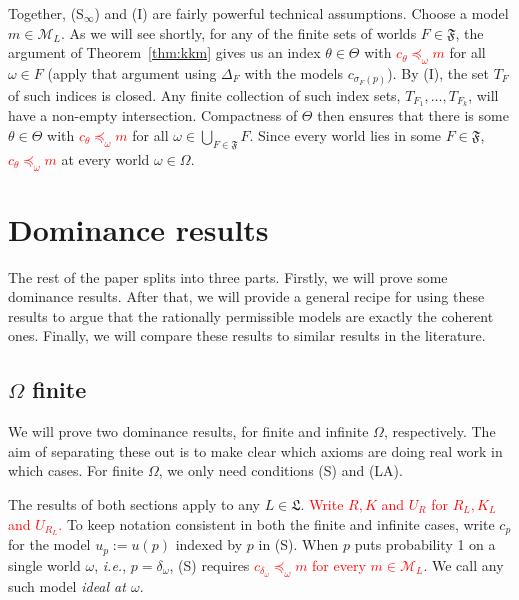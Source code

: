 \documentclass[11pt]{article}
\theoremstyle{definition}
\theoremstyle{remark}
\newcommand{\M}{\mathcal M}
\newcommand{\F}{\mathfrak F}
\begin{document}
Together, (S$_\infty$) and (I) are fairly powerful technical assumptions. Choose a model $m\in\M_L$. As we will see shortly, for any of the finite sets of worlds $F\in\F$, the argument of Theorem~\ref{thm:kkm} gives us an index $\theta\in\Theta$ with \textcolor{red}{$c_\theta\preceq_\omega m$} for all $\omega\in F$ (apply that argument using $\Delta_F$ with the models $c_{\sigma_F(p)}$). By (I), the set $T_F$ of such indices is closed. Any finite collection of such index sets, $T_{F_1},\dots, T_{F_k}$, will have a non-empty intersection. Compactness of $\Theta$ then ensures that there is some $\theta\in\Theta$ with \textcolor{red}{$c_\theta\preceq_\omega m$} for all $\omega\in \bigcup_{F\in\F}F$. Since every world lies in some $F\in\F$, \textcolor{red}{$c_\theta\preceq_\omega m$} at every world $\omega\in\Omega$.




\section{Dominance results}\label{sec:results}


The rest of the paper splits into three parts. Firstly, we will prove some dominance results. After that, we will provide a general recipe for using these results to argue that the rationally permissible models are exactly the coherent ones. Finally, we will compare these results to similar results in the literature.






\subsection{$\Omega$ finite}\label{sec:kkm}


We will prove two dominance results, for finite and infinite $\Omega$, respectively. The aim of separating these out is to make clear which axioms are doing real work in which cases. For finite $\Omega$, we only need conditions (S) and (LA).

The results of both sections apply to any $L\in\mathfrak L$. \textcolor{red}{Write $R,K$ and $U_R$ for $R_L,K_L$ and $U_{R_L}$.} To keep notation consistent in both the finite and infinite cases, write $c_p$ for the model $u_p:=u(p)$ indexed by $p$ in (S). When $p$ puts probability 1 on a single world $\omega$, \textit{i.e.}, $p=\delta_\omega$, (S) requires \textcolor{red}{$c_{\delta_\omega}\preceq_\omega m$ for every $m\in\M_L$}. We call any such model \emph{ideal at $\omega$}. 
\end{document}
